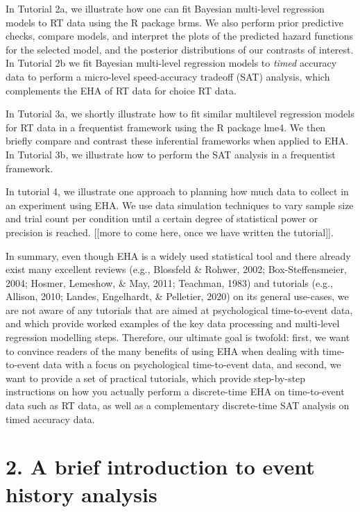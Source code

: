 \documentclass[
  man, donotrepeattitle,floatsintext]{apa6}
\begin{document}
In Tutorial 2a, we illustrate how one can fit Bayesian multi-level regression models to RT data using the R package brms. We also perform prior predictive checks, compare models, and interpret the plots of the predicted hazard functions for the selected model, and the posterior distributions of our contrasts of interest. In Tutorial 2b we fit Bayesian multi-level regression models to \emph{timed} accuracy data to perform a micro-level speed-accuracy tradeoff (SAT) analysis, which complements the EHA of RT data for choice RT data.

In Tutorial 3a, we shortly illustrate how to fit similar multilevel regression models for RT data in a frequentist framework using the R package lme4. We then briefly compare and contrast these inferential frameworks when applied to EHA. In Tutorial 3b, we illustrate how to perform the SAT analysis in a frequentist framework.

In tutorial 4, we illustrate one approach to planning how much data to collect in an experiment using EHA. We use data simulation techniques to vary sample size and trial count per condition until a certain degree of statistical power or precision is reached. {[}{[}more to come here, once we have written the tutorial{]}{]}.

In summary, even though EHA is a widely used statistical tool and there already exist many excellent reviews (e.g., Blossfeld \& Rohwer, 2002; Box-Steffensmeier, 2004; Hosmer, Lemeshow, \& May, 2011; Teachman, 1983) and tutorials (e.g., Allison, 2010; Landes, Engelhardt, \& Pelletier, 2020) on its general use-cases, we are not aware of any tutorials that are aimed at psychological time-to-event data, and which provide worked examples of the key data processing and multi-level regression modelling steps.
Therefore, our ultimate goal is twofold: first, we want to convince readers of the many benefits of using EHA when dealing with time-to-event data with a focus on psychological time-to-event data, and second, we want to provide a set of practical tutorials, which provide step-by-step instructions on how you actually perform a discrete-time EHA on time-to-event data such as RT data, as well as a complementary discrete-time SAT analysis on timed accuracy data.

\section{2. A brief introduction to event history analysis}\label{a-brief-introduction-to-event-history-analysis}
\end{document}
